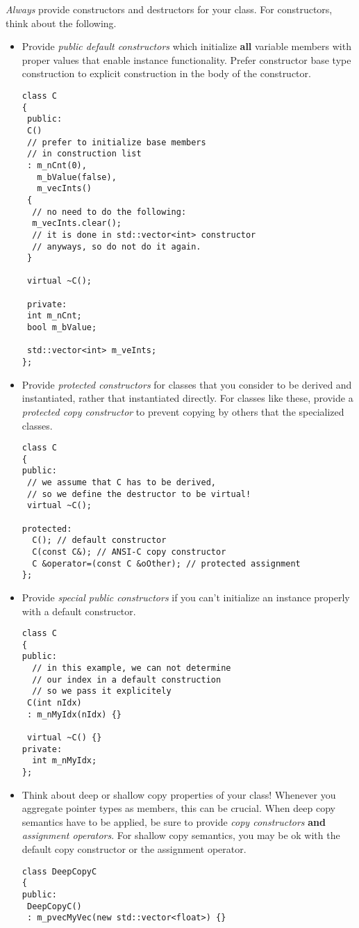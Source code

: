 \emph{Always} provide constructors and destructors for your class.
For constructors, think about the following.
\begin{itemize}
\item Provide \emph{public default constructors} which initialize \textbf{all} variable members with proper values that enable instance functionality.
Prefer constructor base type construction to explicit construction in the body of the constructor.
\begin{verbatim}
class C
{
 public:
 C()
 // prefer to initialize base members
 // in construction list
 : m_nCnt(0),
   m_bValue(false),
   m_vecInts()
 {
  // no need to do the following:
  m_vecInts.clear();
  // it is done in std::vector<int> constructor
  // anyways, so do not do it again.
 }
 
 virtual ~C();
 
 private:
 int m_nCnt;
 bool m_bValue;
 
 std::vector<int> m_veInts;
};
\end{verbatim}
\item Provide \emph{protected constructors} for classes that you consider to be derived and instantiated, rather that instantiated directly.
For classes like these, provide a \emph{protected copy constructor} to prevent copying by others that the specialized classes.
\begin{verbatim}
class C
{
public:
 // we assume that C has to be derived,
 // so we define the destructor to be virtual!
 virtual ~C();
 
protected:
  C(); // default constructor
  C(const C&); // ANSI-C copy constructor
  C &operator=(const C &oOther); // protected assignment
};
\end{verbatim}
\item Provide \emph{special public constructors} if you can't initialize an instance properly with a default constructor.
\begin{verbatim}
class C
{
public:
  // in this example, we can not determine
  // our index in a default construction
  // so we pass it explicitely
 C(int nIdx)
 : m_nMyIdx(nIdx) {}
 
 virtual ~C() {}
private:
  int m_nMyIdx;
};
\end{verbatim}
\item Think about deep or shallow copy properties of your class!
Whenever you aggregate pointer types as members, this can be crucial.
When deep copy semantics have to be applied, be sure to provide \emph{copy constructors} \textbf{and} \emph{assignment operators}.
For shallow copy semantics, you may be ok with the default copy constructor or the assignment operator.
\begin{verbatim}
class DeepCopyC
{
public:
 DeepCopyC()
 : m_pvecMyVec(new std::vector<float>) {}
 

\end{verbatim}
\end{itemize}
